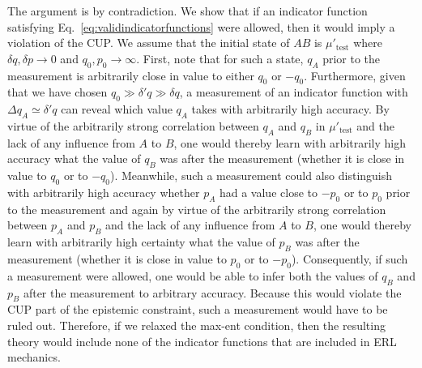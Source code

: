 \documentclass[pra,superscriptaddress,nofootinbib,12pt]{revtex4-2}
\begin{document}
The argument is by contradiction.  We show that if an indicator function satisfying Eq.~\eqref{eq:validindicatorfunctions} were allowed, then it would imply a violation of the CUP.
 We assume that the initial state of $AB$ is $\mu'_{\textrm{test}}$ where $\delta q, \delta p \to 0$ and $q_0,p_0 \to \infty$.  First, note that for such a state, $q_A$ prior to the measurement is arbitrarily close in value to either $q_0$ or $-q_0$.  Furthermore, given that we have chosen
$q_0 \gg \delta' q \gg \delta q$, a measurement of an indicator function with $\Delta q_A \simeq \delta' q$  can reveal which value $q_A$ takes with arbitrarily high accuracy.
By virtue of the arbitrarily strong correlation between $q_A$ and $q_B$ in $\mu'_{\textrm{test}}$ and the lack of any influence from $A$ to $B$, one would thereby learn with arbitrarily high accuracy what the value of $q_B$ was after the measurement (whether it is close in value to $q_0$ or to $-q_0$).  Meanwhile, such a measurement could also distinguish with arbitrarily high accuracy whether $p_A$ had a value close to $-p_0$ or to $p_0$ prior to the measurement and again by virtue of the arbitrarily strong correlation between $p_A$ and $p_B$ and the lack of any influence from $A$ to $B$, one would thereby learn with arbitrarily high certainty what the value of $p_B$ was after the measurement (whether it is close in value to $p_0$ or to $-p_0$). Consequently, if such a measurement were allowed, one would be able to infer both the values of $q_B$ and $p_B$ after the measurement to arbitrary accuracy.  Because this would violate the CUP part of the epistemic constraint, such a measurement would have to be ruled out.  Therefore, if we relaxed the max-ent condition, then the resulting theory would include none of the indicator functions that are included in ERL mechanics.
\end{document}
